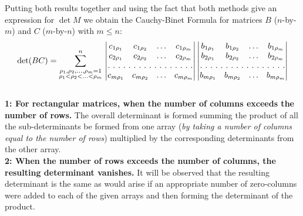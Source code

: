 Putting both results together and using the fact that both methods give an expression for $\det M$ we obtain the Cauchy-Binet Formula for matrices $B$ ($n$-by-$m$) and $C$ ($m$-by-$n$) with $m\le n$:
\begin{equation}
\det(BC) =\sum_{\substack{\rho_1, \rho_2, ...,\rho_m =1 \\ \rho_1 < \rho_2 < ... < \rho_m}}^n \,
\begin{vmatrix}
c_{1\rho_1} & c_{1\rho_2} & \hdots & c_{1\rho_m} \\
c_{2\rho_1} & c_{2\rho_2} & \hdots & c_{2\rho_m} \\
\hdotsfor[2]{4}\\
c_{m\rho_1} & c_{m\rho_2} & \hdots & c_{m\rho_m} \\
\end{vmatrix}
\begin{vmatrix}
b_{1\rho_1} & b_{1\rho_2} & \hdots & b_{1\rho_m} \\
b_{2\rho_1} & b_{2\rho_2} & \hdots & b_{2\rho_m} \\
\hdotsfor[2]{4}\\
b_{m\rho_1} & b_{m\rho_2} & \hdots & b_{m\rho_m} \\
\end{vmatrix}
\end{equation}\\

{\bf 1: For rectangular matrices, when the number of columns exceeds the number of rows.} The overall determinant is formed summing the product of all the sub-determinants be formed from one array {(\it by taking a number of columns equal to the number of rows}) multiplied by the corresponding determinants from the other array.\\

{\bf 2: When the number of rows exceeds the number of columns, the resulting determinant vanishes.} It will be observed that the resulting determinant is the same as would arise if an appropriate number of zero-columns were added to each of the given arrays and then forming the determinant of the product.\\

